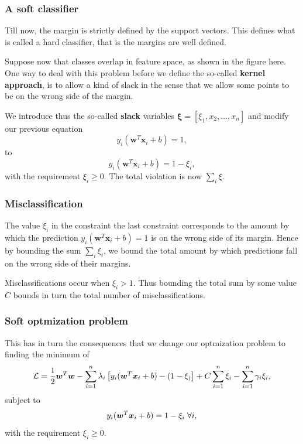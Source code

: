 \documentclass{beamer}
\begin{document}
\begin{frame}
\frametitle{A soft classifier}

Till now, the margin is strictly defined by the support vectors. This defines what is called a hard classifier, that is the margins are well defined.

Suppose now that classes overlap in feature space, as shown in the
figure here. One way to deal with this problem before we define the
so-called \textbf{kernel approach}, is to allow a kind of slack in the sense
that we allow some points to be on the wrong side of the margin.

We introduce thus the so-called \textbf{slack} variables $\bm{\xi} =[\xi_1,x_2,\dots,x_n]$ and 
modify our previous equation
\[
y_i(\bm{w}^T\bm{x}_i+b)=1,
\]
to 
\[
y_i(\bm{w}^T\bm{x}_i+b)=1-\xi_i,
\]
with the requirement $\xi_i\geq 0$. The total violation is now $\sum_i\xi$.
\end{frame}

\begin{frame}
\frametitle{Misclassification}

The value $\xi_i$ in the constraint the last constraint corresponds to
the amount by which the prediction $y_i(\bm{w}^T\bm{x}_i+b)=1$ is on
the wrong side of its margin. Hence by bounding the sum $\sum_i
\xi_i$, we bound the total amount by which predictions fall on the
wrong side of their margins.

Misclassifications occur when $\xi_i > 1$. Thus bounding the total sum by some value $C$ bounds in turn the total number of
misclassifications.
\end{frame}

\begin{frame}
\frametitle{Soft optmization problem}

This has in turn the consequences that we change our optmization problem to finding the minimum of 
\[
{\cal L}=\frac{1}{2}\bm{w}^T\bm{w}-\sum_{i=1}^n\lambda_i\left[y_i(\bm{w}^T\bm{x}_i+b)-(1-\xi_)\right]+C\sum_{i=1}^n\xi_i-\sum_{i=1}^n\gamma_i\xi_i,
\]
subject to 
\[
y_i(\bm{w}^T\bm{x}_i+b)=1-\xi_i \hspace{0.1cm}\forall i,
\]
with the requirement $\xi_i\geq 0$.
\end{frame}
\end{document}
